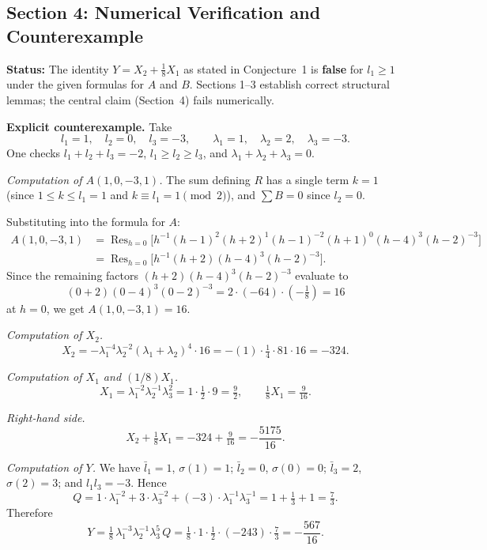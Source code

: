 \subsection*{Section 4: Numerical Verification and Counterexample}

\textbf{Status:} The identity $Y = X_2 + \frac18 X_1$ as stated in Conjecture~1 is \textbf{false} for $l_1 \ge 1$ under the given formulas for $A$ and $B$. Sections 1--3 establish correct structural lemmas; the central claim (Section~4) fails numerically.

\medskip

\textbf{Explicit counterexample.}
Take
\[
  l_1 = 1,\quad l_2 = 0,\quad l_3 = -3,\qquad \lambda_1 = 1,\quad \lambda_2 = 2,\quad \lambda_3 = -3.
\]
One checks $l_1+l_2+l_3 = -2$, $l_1\ge l_2\ge l_3$, and $\lambda_1+\lambda_2+\lambda_3 = 0$.

\medskip
\textit{Computation of $A(1,0,-3,1)$.}
The sum defining $R$ has a single term $k=1$ (since $1\le k\le l_1=1$ and $k\equiv l_1=1\pmod{2}$), and $\sum B = 0$ since $l_2=0$.

Substituting into the formula for $A$:
\begin{align*}
  A(1,0,-3,1) &= \operatorname{Res}_{h=0}\bigl[h^{-1}(h-1)^2(h+2)^1(h-1)^{-2}(h+1)^0(h-4)^3(h-2)^{-3}\bigr]\\
  &= \operatorname{Res}_{h=0}\bigl[h^{-1}(h+2)(h-4)^3(h-2)^{-3}\bigr].
\end{align*}
Since the remaining factors $(h+2)(h-4)^3(h-2)^{-3}$ evaluate to
\[
  (0+2)(0-4)^3(0-2)^{-3} = 2\cdot(-64)\cdot(-\tfrac18) = 16
\]
at $h=0$, we get $A(1,0,-3,1) = 16$.

\medskip
\textit{Computation of $X_2$.}
\[
  X_2 = -\lambda_1^{-4}\lambda_2^{-2}(\lambda_1+\lambda_2)^4\cdot 16
       = -(1)\cdot\tfrac14\cdot 81\cdot 16 = -324.
\]

\textit{Computation of $X_1$ and $(1/8)X_1$.}
\[
  X_1 = \lambda_1^{-2}\lambda_2^{-1}\lambda_3^{2} = 1\cdot\tfrac12\cdot 9 = \tfrac92,\qquad
  \tfrac18 X_1 = \tfrac{9}{16}.
\]

\textit{Right-hand side.}
\[
  X_2 + \tfrac18 X_1 = -324 + \tfrac{9}{16} = -\frac{5175}{16}.
\]

\textit{Computation of $Y$.}
We have $\bar l_1=1$, $\sigma(1)=1$; $\bar l_2=0$, $\sigma(0)=0$; $\bar l_3=2$, $\sigma(2)=3$; and $l_1l_3=-3$.  Hence
\[
  Q = 1\cdot\lambda_1^{-2} + 3\cdot\lambda_3^{-2} + (-3)\cdot\lambda_1^{-1}\lambda_3^{-1}
    = 1 + \tfrac{1}{3} + 1 = \tfrac{7}{3}.
\]
Therefore
\[
  Y = \tfrac18\,\lambda_1^{-3}\lambda_2^{-1}\lambda_3^{5}\,Q
    = \tfrac18\cdot 1\cdot\tfrac12\cdot(-243)\cdot\tfrac73
    = -\frac{567}{16}.
\]

